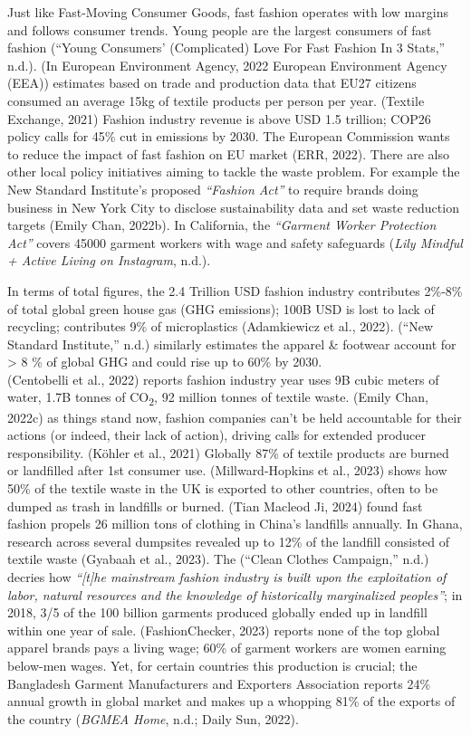 \documentclass[
  12pt,
  letterpaper,
  DIV=11,
  numbers=noendperiod]{scrartcl}
\begin{document}
Just like Fast-Moving Consumer Goods, fast fashion operates with low
margins and follows consumer trends. Young people are the largest
consumers of fast fashion ({``Young {Consumers}' ({Complicated}) {Love
For Fast Fashion In} 3 {Stats},''} n.d.). (In European Environment
Agency, 2022 European Environment Agency (EEA)) estimates based on trade
and production data that EU27 citizens consumed an average 15kg of
textile products per person per year. (Textile Exchange, 2021) Fashion
industry revenue is above USD 1.5 trillion; COP26 policy calls for 45\%
cut in emissions by 2030. The European Commission wants to reduce the
impact of fast fashion on EU market (ERR, 2022). There are also other
local policy initiatives aiming to tackle the waste problem. For example
the New Standard Institute's proposed \emph{``Fashion Act''} to require
brands doing business in New York City to disclose sustainability data
and set waste reduction targets (Emily Chan, 2022b). In California, the
\emph{``Garment Worker Protection Act''} covers 45000 garment workers
with wage and safety safeguards (\emph{Lily {\textbar} Mindful + Active
Living on {Instagram}}, n.d.).

In terms of total figures, the 2.4 Trillion USD fashion industry
contributes 2\%-8\% of total global green house gas (GHG emissions);
100B USD is lost to lack of recycling; contributes 9\% of microplastics
(Adamkiewicz et al., 2022). ({``New {Standard Institute},''} n.d.)
similarly estimates the apparel \& footwear account for \textgreater{} 8
\% of global GHG and could rise up to 60\% by 2030.\\
(Centobelli et al., 2022) reports fashion industry year uses 9B cubic
meters of water, 1.7B tonnes of CO\textsubscript{2}, 92 million tonnes
of textile waste. (Emily Chan, 2022c) as things stand now, fashion
companies can't be held accountable for their actions (or indeed, their
lack of action), driving calls for extended producer responsibility.
(Köhler et al., 2021) Globally 87\% of textile products are burned or
landfilled after 1st consumer use. (Millward-Hopkins et al., 2023) shows
how 50\% of the textile waste in the UK is exported to other countries,
often to be dumped as trash in landfills or burned. (Tian Macleod Ji,
2024) found fast fashion propels 26 million tons of clothing in China's
landfills annually. In Ghana, research across several dumpsites revealed
up to 12\% of the landfill consisted of textile waste (Gyabaah et al.,
2023). The ({``Clean {Clothes Campaign},''} n.d.) decries how
\emph{``{[}t{]}he mainstream fashion industry is built upon the
exploitation of labor, natural resources and the knowledge of
historically marginalized peoples''}; in 2018, 3/5 of the 100 billion
garments produced globally ended up in landfill within one year of sale.
(FashionChecker, 2023) reports none of the top global apparel brands
pays a living wage; 60\% of garment workers are women earning below-men
wages. Yet, for certain countries this production is crucial; the
Bangladesh Garment Manufacturers and Exporters Association reports 24\%
annual growth in global market and makes up a whopping 81\% of the
exports of the country (\emph{{BGMEA} {\textbar} {Home}}, n.d.; Daily
Sun, 2022).
\end{document}
